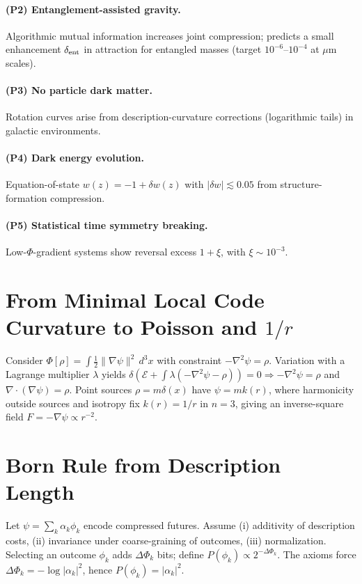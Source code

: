 \documentclass[aps,preprint,onecolumn,longbibliography,nofootinbib]{revtex4-2}
\numberwithin{equation}{section}        %
\begin{document}
\paragraph*{(P2) Entanglement-assisted gravity.}
Algorithmic mutual information increases joint compression; predicts a small enhancement $\delta_{\rm ent}$ in attraction for entangled masses (target $10^{-6}$–$10^{-4}$ at $\mu$m scales).

\paragraph*{(P3) No particle dark matter.}
Rotation curves arise from description-curvature corrections (logarithmic tails) in galactic environments.

\paragraph*{(P4) Dark energy evolution.}
Equation-of-state $w(z)=-1+\delta w(z)$ with $|\delta w|\lesssim 0.05$ from structure-formation compression.

\paragraph*{(P5) Statistical time symmetry breaking.}
Low-$\Phi$-gradient systems show reversal excess $1+\xi$, with $\xi\sim 10^{-3}$.

\appendix

\section{From Minimal Local Code Curvature to Poisson and $1/r$}\label{app:A}
Consider $\Phi[\rho]=\int \tfrac12 \|\nabla\psi\|^2\,d^3x$ with constraint $-\nabla^2\psi=\rho$. Variation with a Lagrange multiplier $\lambda$ yields $\delta(\mathcal{E}+\int \lambda(-\nabla^2\psi-\rho))=0 \Rightarrow -\nabla^2\psi=\rho$ and $\nabla\cdot(\nabla\psi)=\rho$. Point sources $\rho=m\delta(x)$ have $\psi=mk(r)$, where harmonicity outside sources and isotropy fix $k(r)=1/r$ in $n=3$, giving an inverse-square field $F=-\nabla\psi\propto r^{-2}$.

\section{Born Rule from Description Length}\label{app:B}
Let $\psi=\sum_k \alpha_k \phi_k$ encode compressed futures. Assume (i) additivity of description costs, (ii) invariance under coarse-graining of outcomes, (iii) normalization. Selecting an outcome $\phi_k$ adds $\Delta\Phi_k$ bits; define $P(\phi_k)\propto 2^{-\Delta\Phi_k}$. The axioms force $\Delta\Phi_k=-\log|\alpha_k|^2$, hence $P(\phi_k)=|\alpha_k|^2$.
\end{document}
